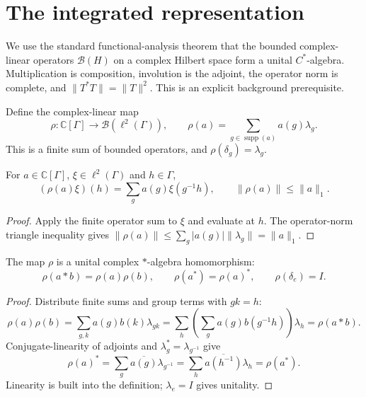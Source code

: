 \section{The integrated representation}

We use the standard functional-analysis theorem that the bounded
complex-linear operators $\mathcal B(H)$ on a complex Hilbert space form
a unital $C^*$-algebra. Multiplication is composition, involution is
the adjoint, the operator norm is complete, and $\|T^*T\|=\|T\|^2$.
This is an explicit background prerequisite.

\begin{definition}\label{def:integrated-representation}
\leanok
{}
Define the complex-linear map
\[
 \rho:\mathbb C[\Gamma]\longrightarrow\mathcal B(\ell^2(\Gamma)),
 \qquad \rho(a)=\sum_{g\in\operatorname{supp}(a)}a(g)\lambda_g.
\]
This is a finite sum of bounded operators, and $\rho(\delta_g)=\lambda_g$.
\end{definition}

\begin{lemma}\label{lem:integrated-action-bound}
\leanok
{}
For $a\in\mathbb C[\Gamma]$, $\xi\in\ell^2(\Gamma)$ and $h\in\Gamma$,
\[
 (\rho(a)\xi)(h)=\sum_g a(g)\xi(g^{-1}h),\qquad
 \|\rho(a)\|\leq\|a\|_1.
\]
\end{lemma}
\begin{proof}
\leanok
Apply the finite operator sum to $\xi$ and evaluate at $h$.
The operator-norm triangle inequality gives
$\|\rho(a)\|\leq\sum_g|a(g)|\|\lambda_g\|=\|a\|_1$.
\end{proof}

\begin{proposition}\label{prop:integrated-star-hom}
\leanok
{}
The map $\rho$ is a unital complex $*$-algebra homomorphism:
\[
 \rho(a*b)=\rho(a)\rho(b),\qquad
 \rho(a^*)=\rho(a)^*,\qquad \rho(\delta_e)=I.
\]
\end{proposition}
\begin{proof}
\leanok
Distribute finite sums and group terms with $gk=h$:
\[
 \rho(a)\rho(b)=\sum_{g,k}a(g)b(k)\lambda_{gk}
 =\sum_h\left(\sum_g a(g)b(g^{-1}h)\right)\lambda_h
 =\rho(a*b).
\]
Conjugate-linearity of adjoints and $\lambda_g^*=\lambda_{g^{-1}}$ give
\[
 \rho(a)^*=\sum_g\overline{a(g)}\lambda_{g^{-1}}
 =\sum_h\overline{a(h^{-1})}\lambda_h=\rho(a^*).
\]
Linearity is built into the definition; $\lambda_e=I$ gives unitality.
\end{proof}

